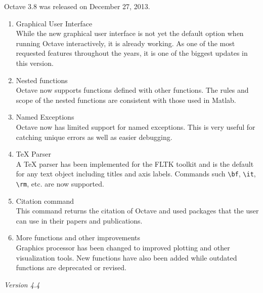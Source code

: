 \documentclass{article}
\begin{document}
\par
Octave 3.8 was released on December 27, 2013.
\begin{enumerate}

    \item Graphical User Interface\\
    While the new graphical user interface is not yet the default option when running Octave interactively, it is already working. As one of the most requested features throughout the years, it is one of the biggest updates in this version.

    \item Nested functions\\
    Octave now supports functions defined with other functions. The rules and scope of the nested functions are consistent with those used in Matlab.

    \item Named Exceptions\\
    Octave now has limited support for named exceptions. This is very useful for catching unique errors as well as easier debugging.

    \item \TeX{} Parser\\
    A \TeX{} parser has been implemented for the FLTK toolkit and is the default for any text object including titles and axis labels. Commands such \verb|\bf|, \verb|\it|, \verb|\rm|, etc. are now supported.

    \item Citation command\\
    This command returns the citation of Octave and used packages that the user can use in their papers and publications.

    \item More functions and other improvements\\
    Graphics processor has been changed to improved plotting and other visualization tools. New functions have also been added while outdated functions are deprecated or revised.

\end{enumerate}

\par
\noindent
\textit{Version 4.4}
\end{document}
